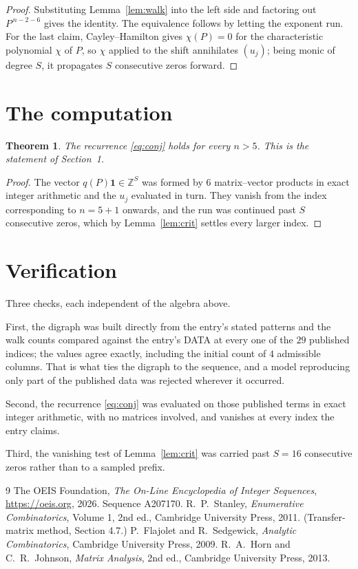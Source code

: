 \documentclass[11pt,a4paper]{article}
\theoremstyle{plain}
\newtheorem{theorem}{Theorem}
\theoremstyle{definition}
\begin{document}
\begin{proof}
Substituting Lemma~\ref{lem:walk} into the left side and factoring out
$P^{\,n-2-6}$ gives the identity. The equivalence follows by letting the exponent
run. For the last claim, Cayley--Hamilton gives $\chi(P)=0$ for the characteristic
polynomial $\chi$ of $P$, so $\chi$ applied to the shift annihilates $(u_j)$; being monic of
degree $S$, it propagates $S$ consecutive zeros forward.
\end{proof}

\section{The computation}

\begin{theorem}
The recurrence \eqref{eq:conj} holds for every $n>5$. This is the statement of
Section~1.
\end{theorem}

\begin{proof}
The vector $q(P)\mathbf{1}\in\mathbb{Z}^{S}$ was formed by $6$ matrix--vector
products in exact integer arithmetic and the $u_j$ evaluated in turn. They vanish from the
index corresponding to $n=5+1$ onwards, and the run was continued past $S$ consecutive
zeros, which by Lemma~\ref{lem:crit} settles every larger index.
\end{proof}

\section{Verification}

Three checks, each independent of the algebra above.

First, the digraph was built directly from the entry's stated patterns and the walk counts
compared against the entry's DATA at every one of the $29$ published indices; the
values agree exactly, including the initial count of $4$ admissible columns. That is
what ties the digraph to the sequence, and a model reproducing only part of the published
data was rejected wherever it occurred.

Second, the recurrence \eqref{eq:conj} was evaluated on those published terms in exact
integer arithmetic, with no matrices involved, and vanishes at every index the entry claims.

Third, the vanishing test of Lemma~\ref{lem:crit} was carried past $S=16$ consecutive
zeros rather than to a sampled prefix.

\begin{thebibliography}{9}
 The OEIS Foundation, \emph{The On-Line Encyclopedia of Integer
Sequences}, \url{https://oeis.org}, 2026. Sequence A207170.
 R.~P.~Stanley, \emph{Enumerative Combinatorics}, Volume 1, 2nd ed.,
Cambridge University Press, 2011. (Transfer-matrix method, Section 4.7.)
 P.~Flajolet and R.~Sedgewick, \emph{Analytic Combinatorics}, Cambridge
University Press, 2009.
 R.~A.~Horn and C.~R.~Johnson, \emph{Matrix Analysis}, 2nd ed., Cambridge
University Press, 2013.
\end{thebibliography}
\end{document}
